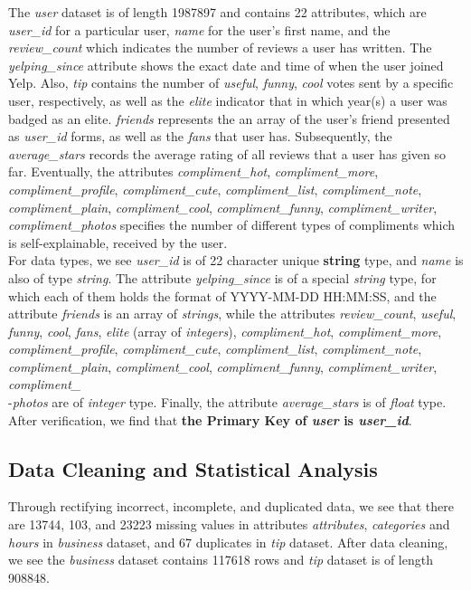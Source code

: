 \documentclass[runningheads]{llncs}
\begin{document}
The \textit{user} dataset is of length 1987897 and contains 22 attributes, which are \textit{user\_id} for a particular user, \textit{name} for the user's first name, and the \textit{review\_count} which indicates the number of reviews a user has written. The \textit{yelping\_since} attribute shows the exact date and time of when the user joined Yelp. Also, \textit{tip} contains the number of \textit{useful}, \textit{funny}, \textit{cool} votes sent by a specific user, respectively, as well as the \textit{elite} indicator that in which year(s) a user was badged as an elite. \textit{friends} represents the an array of the user's friend presented as \textit{user\_id} forms, as well as the \textit{fans} that user has. Subsequently, the \textit{average\_stars} records the average rating of all reviews that a user has given so far. Eventually, the attributes \textit{compliment\_hot}, \textit{compliment\_more}, \textit{compliment\_profile}, \textit{compliment\_cute}, \textit{compliment\_list}, \textit{compliment\_note}, \textit{compliment\_plain}, \textit{compliment\_cool}, \textit{compliment\_funny}, \textit{compliment\_writer}, \textit{compliment\_photos} specifies the number of different types of compliments which is self-explainable, received by the user. \\ 
For data types, we see \textit{user\_id} is of 22 character unique \textbf{string} type, and \textit{name} is also of type \textit{string}. The attribute \textit{yelping\_since} is of a special \textit{string} type, for which each of them holds the format of YYYY-MM-DD HH:MM:SS, and the attribute \textit{friends} is an array of \textit{strings}, while the attributes \textit{review\_count}, \textit{useful}, \textit{funny}, \textit{cool}, \textit{fans}, \textit{elite} (array of \textit{integers}), \textit{compliment\_hot}, \textit{compliment\_more}, \textit{compliment\_profile}, \textit{compliment\_cute}, \textit{compliment\_list}, \textit{compliment\_note}, \textit{compliment\_plain}, \textit{compliment\_cool}, \textit{compliment\_funny}, \textit{compliment\_writer}, \textit{compliment\_}\\
-\textit{photos} are of \textit{integer} type. Finally, the attribute \textit{average\_stars} is of \textit{float} type. \\
After verification, we find that \textbf{the Primary Key of \textit{user} is \textit{user\_id}}. 

\subsection{Data Cleaning and Statistical Analysis}
Through rectifying incorrect, incomplete, and duplicated data, we see that there are 13744, 103, and 23223 missing values in attributes \textit{attributes}, \textit{categories} and \textit{hours} in \textit{business} dataset, and 67 duplicates in \textit{tip} dataset. After data cleaning, we see the \textit{business} dataset contains 117618 rows and \textit{tip} dataset is of length 908848. 
\end{document}

